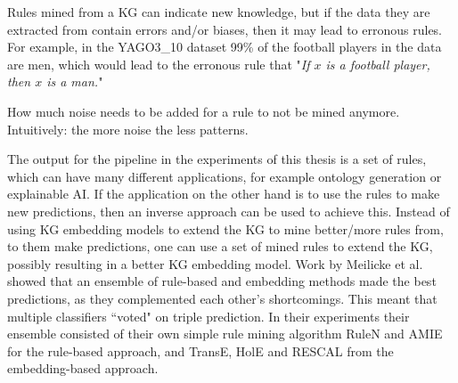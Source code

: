 Rules mined from a KG can indicate new knowledge, but if the data they are extracted from contain errors and/or biases, then it may lead to erronous rules. For example, in the YAGO3\_10 dataset 99\% of the football players in the data are men, which would lead to the erronous rule that "\textit{If $x$ is a football player, then $x$ is a man.}"

How much noise needs to be added for a rule to not be mined anymore. Intuitively: the more noise the less patterns.

The output for the pipeline in the experiments of this thesis is a set of rules, which can have many different applications, for example ontology generation or explainable AI. If the application on the other hand is to use the rules to make new predictions, then an inverse approach can be used to achieve this. Instead of using KG embedding models to extend the KG to mine better/more rules from, to them make predictions, one can use a set of mined rules to extend the KG, possibly resulting in a better KG embedding model. Work by Meilicke et al. \cite{ensemble} showed that an ensemble of rule-based and embedding methods made the best predictions, as they complemented each other's shortcomings. This meant that multiple classifiers ``voted" on triple prediction. In their experiments their ensemble consisted of their own simple rule mining algorithm RuleN and AMIE for the rule-based approach, and TransE, HolE and RESCAL from the embedding-based approach.